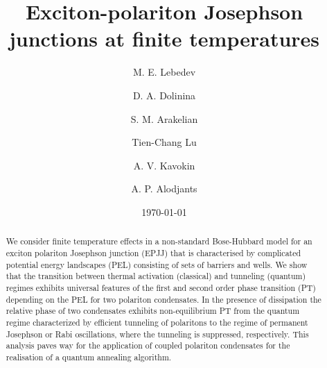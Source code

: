 \documentclass[aps, pre, preprint, groupedaddress, superscriptaddress, showkeys, showpacs] {revtex4-1}
\begin{document}
\title{{Exciton-polariton Josephson junctions at finite temperatures}}

\author{M. E. Lebedev}

\author{D. A. Dolinina}

\author{S. M. Arakelian}

\author{Tien-Chang Lu}

\author{A. V. Kavokin}

\author{A. P. Alodjants}

\date{\today}

\begin{abstract}
We consider finite temperature effects in a non-standard Bose-Hubbard model for an exciton polariton Josephson junction (EPJJ) that is characterised by complicated potential energy landscapes (PEL) consisting of sets of barriers and wells.
We show that the transition between  thermal  activation (classical) and tunneling (quantum) regimes exhibits universal features of the first and second order phase transition (PT) depending on the PEL for two polariton condensates.
In the presence of dissipation the relative phase of two condensates exhibits non-equilibrium PT from the quantum regime characterized by efficient tunneling of polaritons to the regime of permanent Josephson or Rabi oscillations, where the tunneling is suppressed, respectively.
This analysis paves way for the application of coupled polariton condensates for the realisation of a quantum annealing algorithm.
 
\end{abstract}

\pacs{\dots}
\keywords{\dots}

\maketitle
\end{document}
